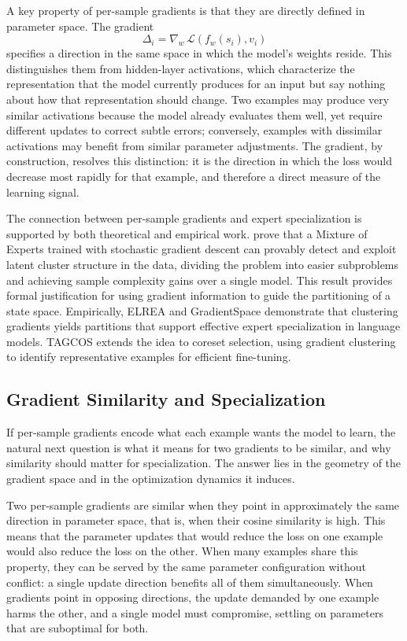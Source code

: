A key property of per-sample gradients is that they are directly defined in parameter space. The gradient 
\[
\Delta_i=\nabla_w \, \mathcal{L}(f_w(s_i),v_i)
\]
specifies a direction in the same space in which the model's weights reside. This distinguishes them from hidden-layer activations, which characterize the representation that the model currently produces for an input but say nothing about how that representation should change. Two examples may produce very similar activations because the model already evaluates them well, yet require different updates to correct subtle errors; conversely, examples with dissimilar activations may benefit from similar parameter adjustments. The gradient, by construction, resolves this distinction: it is the direction in which the loss would decrease most rapidly for that example, and therefore a direct measure of the learning signal.

The connection between per-sample gradients and expert specialization is supported by both theoretical and empirical work. \textcite{kawata2025} prove that a Mixture of Experts trained with stochastic gradient descent can provably detect and exploit latent cluster structure in the data, dividing the problem into easier subproblems and achieving sample complexity gains over a single model. This result provides formal justification for using gradient information to guide the partitioning of a state space. Empirically, ELREA and GradientSpace demonstrate that clustering gradients yields partitions that support effective expert specialization in language models. TAGCOS extends the idea to coreset selection, using gradient clustering to identify representative examples for efficient fine-tuning.

\subsection{Gradient Similarity and Specialization}
If per-sample gradients encode what each example wants the model to learn, the natural next question is what it means for two gradients to be similar, and why similarity should matter for specialization. The answer lies in the geometry of the gradient space and in the optimization dynamics it induces.

Two per-sample gradients are similar when they point in approximately the same direction in parameter space, that is, when their cosine similarity is high. This means that the parameter updates that would reduce the loss on one example would also reduce the loss on the other. When many examples share this property, they can be served by the same parameter configuration without conflict: a single update direction benefits all of them simultaneously. When gradients point in opposing directions, the update demanded by one example harms the other, and a single model must compromise, settling on parameters that are suboptimal for both.


